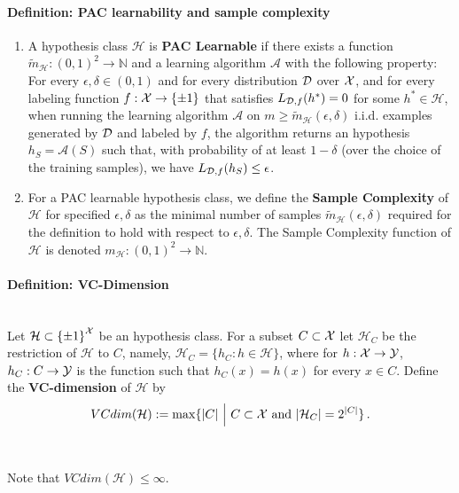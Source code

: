 \documentclass[11pt]{article}
\newcommand{\N}{\ensuremath{\mathbb{N}}}
\newcommand{\Ac}{\mathcal{A}}
\newcommand{\Hc}{\mathcal{H}}
\begin{document}
{\paragraph{Definition: PAC learnability and sample complexity}
\begin{enumerate}
\item
A hypothesis class $\Hc$ is {\bf PAC Learnable} if there exists a function $\tilde{m}_\Hc : (0,1)^2 \to \N$ and a learning algorithm $\Ac$ with the following property:
For every $\epsilon,\delta \in (0,1)$ and for every distribution $\mathcal{D}$ over $\mathcal{X}$, and for every labeling function $f:\mathcal{X}\to\{\pm 1\}$ that satisfies $L_{\mathcal{D},f}(h^*)=0$ for some $h^*\in\Hc$, when running the learning algorithm $\Ac$ on $m\ge \tilde{m}_\Hc(\epsilon,\delta)$ i.i.d. examples generated by $\mathcal{D}$ and labeled by $f$, the algorithm returns an hypothesis $h_S=\Ac(S)$ such that, with probability of at least $1-\delta$ (over the choice of the training samples), we have
$
L_{\mathcal{D}, f}(h_S) \le \epsilon
$. 
\item For a PAC learnable hypothesis class, we define the {\bf Sample
  Complexity} of $\Hc$ for specified $\epsilon,\delta$ as the minimal number of
  samples $\tilde{m}_\Hc(\epsilon,\delta)$ required for the definition to hold
  with respect to $\epsilon,\delta$. The Sample Complexity function of $\Hc$ is
  denoted $m_\Hc:(0,1)^2\to\mathbb{N}$.
\end{enumerate}

\paragraph{Definition: VC-Dimension}
~\\Let $\Hc\subset\left\{ \pm 1 \right\}^\X$ be an hypothesis class.
For a subset $C\subset \mathcal{X}$ let $\Hc_C$ be the restriction of $\Hc$ to $C$, namely,
$\Hc_C = \{ h_C : h \in \Hc\}$, where for $h:\mathcal{X}\to\mathcal{Y}$, $h_C:C\to\mathcal{Y}$ is the
function such that $h_C(x)=h(x)$ for every $x\in C$. Define the {\bf VC-dimension} of $\Hc$ by
\[
  VCdim(\Hc) := \max\{ |C| ~\Big|~ C\subset\X \,\,\text{and}\,\, |\Hc_C|=2^{|C|} \}
  \,.
\]
\\~\\
Note that $VCdim(\Hc)\leq \infty$. 

}
\end{document}
